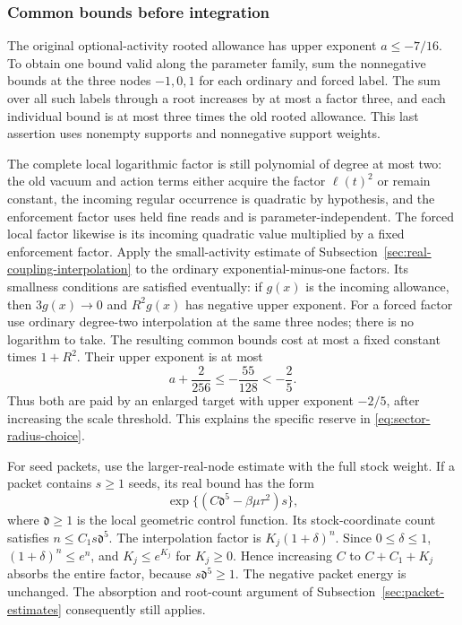 \subsubsection{Common bounds before integration}
The original optional-activity rooted allowance has upper exponent
$a\le-7/16$. To obtain one bound valid along the parameter family,
sum the nonnegative bounds at the three nodes $-1,0,1$ for each
ordinary and forced label. The sum over all such labels through a
root increases by at most a factor three, and each individual
bound is at most three times the old rooted allowance. This last
assertion uses nonempty supports and nonnegative support weights.

The complete local logarithmic factor is still polynomial of degree
at most two: the old vacuum and action terms either acquire the factor
$\ell(t)^2$ or remain constant, the incoming regular occurrence is
quadratic by hypothesis, and the enforcement factor uses held fine
reads and is parameter-independent. The forced local factor likewise
is its incoming quadratic value multiplied by a fixed enforcement factor.
Apply the small-activity estimate of
Subsection~\ref{sec:real-coupling-interpolation} to the ordinary
exponential-minus-one factors. Its smallness conditions are satisfied
eventually: if $g(x)$ is the incoming allowance, then
$3g(x)\to0$ and $R^2g(x)$ has negative upper exponent. For a forced factor use
ordinary degree-two interpolation at the same three nodes; there
is no logarithm to take. The resulting common bounds cost at most
a fixed constant times $1+R^2$. Their upper exponent is at most
\[
                 a+\frac{2}{256}
                     \le-\frac{55}{128}<-\frac25.
\]
Thus both are paid by an enlarged target with upper exponent
$-2/5$, after increasing the scale threshold. This explains the
specific reserve in \eqref{eq:sector-radius-choice}.

For seed packets, use the larger-real-node estimate with the full
stock weight. If a packet contains $s\ge1$ seeds, its real bound
has the form
\[
                    \exp\{(C\mathfrak d^5-\beta\mu\tau^2)s\},
\]
where $\mathfrak d\ge1$ is the local geometric control function.
Its stock-coordinate count satisfies $n\le C_1s\mathfrak d^5$.
The interpolation factor is $K_j(1+\delta)^n$.
Since $0\le\delta\le1$, $(1+\delta)^n\le e^n$, and
$K_j\le e^{K_j}$ for $K_j\ge0$. Hence increasing $C$ to
$C+C_1+K_j$ absorbs the entire factor, because
$s\mathfrak d^5\ge1$. The negative packet energy is unchanged.
The absorption and root-count argument of
Subsection~\ref{sec:packet-estimates} consequently still applies.

